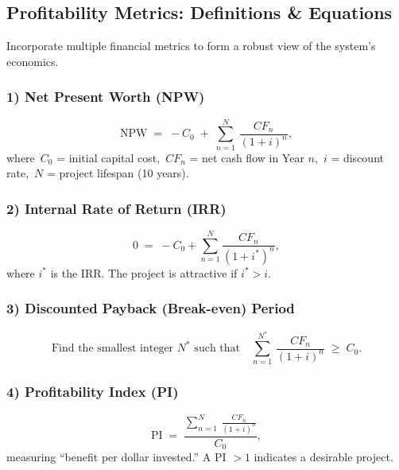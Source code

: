 \documentclass[12pt]{report}
\begin{document}
\vspace{1em}

\subsection{Profitability Metrics: Definitions \& Equations}
Incorporate multiple financial metrics to form a robust view of the system’s economics.

\subsubsection{1) Net Present Worth (NPW)}
\begin{equation}
    \text{NPW} \;=\; -C_0 \;+\; \sum_{n=1}^{N}\,\frac{CF_n}{(1+i)^n},
    \tag{Eq.~A1}
\end{equation}
\noindent where 
\(\,C_0\) = initial capital cost,
\(\,CF_n\) = net cash flow in Year \(n\),
\(\,i\) = discount rate,
\(\,N\) = project lifespan (10 years).

\subsubsection{2) Internal Rate of Return (IRR)}
\begin{equation}
    0 \;=\; -C_0 + \sum_{n=1}^{N} \frac{CF_n}{(1 + i^*)^n},
    \tag{Eq.~A2}
\end{equation}
\noindent where \(i^*\) is the IRR. The project is attractive if \(i^* > i\).

\subsubsection{3) Discounted Payback (Break-even) Period}
\begin{equation}
    \text{Find the smallest integer }N^*\text{ such that} \quad
    \sum_{n=1}^{N^*}\,\frac{CF_n}{(1+i)^n} \;\ge\; C_0.
    \tag{Eq.~A3}
\end{equation}

\subsubsection{4) Profitability Index (PI)}
\begin{equation}
    \text{PI} \;=\; \frac{\sum_{n=1}^{N}\,\frac{CF_n}{(1+i)^n}}{C_0},
    \tag{Eq.~A4}
\end{equation}
\noindent measuring “benefit per dollar invested.” A PI $>1$ indicates a desirable project.
\end{document}
